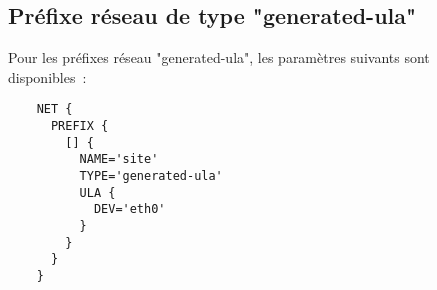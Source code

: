 \subsection{Préfixe réseau de type "generated-ula"}
Pour les préfixes réseau "generated-ula", les paramètres suivants sont disponibles~:

\begin{description}
  \begin{example}
  \begin{verbatim}
    NET {
      PREFIX {
        [] {
          NAME='site'
          TYPE='generated-ula'
          ULA {
            DEV='eth0'
          }
        }
      }
    }
  \end{verbatim}
  \end{example}

\end{description}
